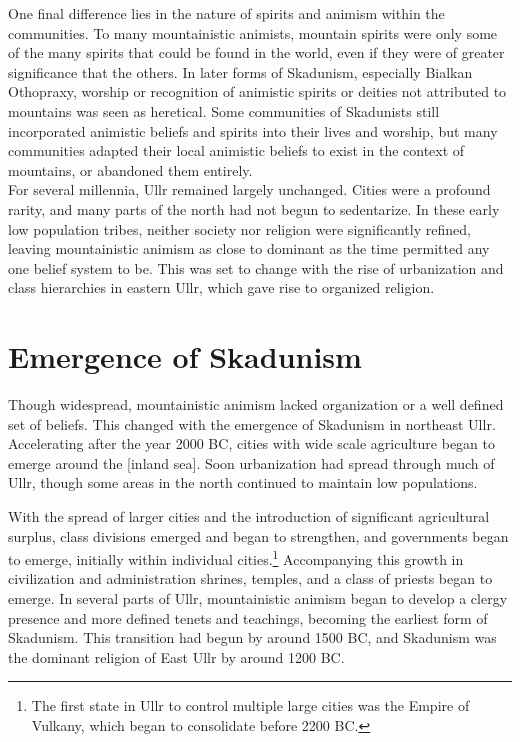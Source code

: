 One final difference lies in the nature of spirits and animism within the communities. To many mountainistic animists, mountain spirits were only some of the many spirits that could be found in the world, even if they were of greater significance that the others. In later forms of Skadunism, especially Bialkan Othopraxy, worship or recognition of animistic spirits or deities not attributed to mountains was seen as heretical. Some communities of Skadunists still incorporated animistic beliefs and spirits into their lives and worship, but many communities adapted their local animistic beliefs to exist in the context of mountains, or abandoned them entirely. \\
 
For several millennia, Ullr remained largely unchanged. Cities were a profound rarity, and many parts of the north had not begun to sedentarize. In these early low population tribes, neither society nor religion were significantly refined, leaving mountainistic animism as close to dominant as the time permitted any one belief system to be. This was set to change with the rise of urbanization and class hierarchies in eastern Ullr, which gave rise to organized religion.
 
\section{Emergence of Skadunism}

Though widespread, mountainistic animism lacked organization or a well defined set of beliefs. This changed with the emergence of Skadunism in northeast Ullr. Accelerating after the year 2000 BC, cities with wide scale agriculture began to emerge around the [inland sea]. Soon urbanization had spread through much of Ullr, though some areas in the north continued to maintain low populations.

With the spread of larger cities and the introduction of significant agricultural surplus, class divisions emerged and began to strengthen, and governments began to emerge, initially within individual cities.\footnote{The first state in Ullr to control multiple large cities was the Empire of Vulkany, which began to consolidate before 2200 BC.} Accompanying this growth in civilization and administration shrines, temples, and a class of priests began to emerge. In several parts of Ullr, mountainistic animism began to develop a clergy presence and more defined tenets and teachings, becoming the earliest form of Skadunism. This transition had begun by around 1500 BC, and Skadunism was the dominant religion of East Ullr by around 1200 BC. 

